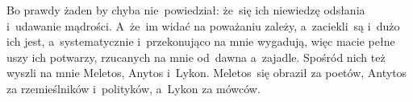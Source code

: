\documentclass[a4paper,11pt]{article}
\begin{document}
Bo prawdy żaden by chyba nie~powiedział: że~się ich niewiedzę odsłania i~udawanie mądrości. A~że~im widać na poważaniu zależy, a~zaciekli~są i~dużo ich jest, a~systematycznie i~przekonująco na mnie wygadują, więc macie pełne uszy ich potwarzy, rzucanych na mnie od~dawna a~zajadle. Spośród nich też wyszli na mnie Meletos, Anytos i~Lykon. Meletos~się obraził za poetów, Antytos za rzemieślników i~polityków, a~Lykon za mówców.


\vspace{\spaceThree}















{}






\end{document}

